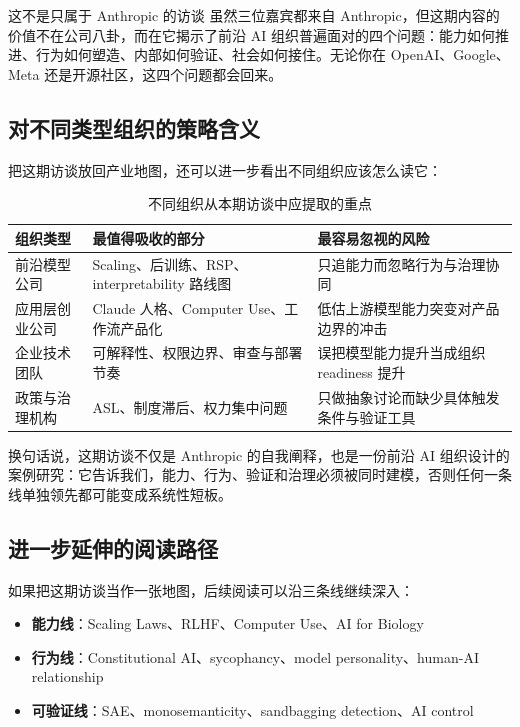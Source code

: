\begin{importantbox}{这不是只属于 Anthropic 的访谈}
虽然三位嘉宾都来自 Anthropic，但这期内容的价值不在公司八卦，而在它揭示了前沿 AI 组织普遍面对的四个问题：能力如何推进、行为如何塑造、内部如何验证、社会如何接住。无论你在 OpenAI、Google、Meta 还是开源社区，这四个问题都会回来。
\end{importantbox}

\subsection{对不同类型组织的策略含义}

把这期访谈放回产业地图，还可以进一步看出不同组织应该怎么读它：

\begin{table}[H]
\centering
\begin{tabular}{p{} p{} p{}}
\toprule
组织类型 & 最值得吸收的部分 & 最容易忽视的风险 \\
\midrule
前沿模型公司 & Scaling、后训练、RSP、interpretability 路线图 & 只追能力而忽略行为与治理协同 \\
应用层创业公司 & Claude 人格、Computer Use、工作流产品化 & 低估上游模型能力突变对产品边界的冲击 \\
企业技术团队 & 可解释性、权限边界、审查与部署节奏 & 误把模型能力提升当成组织 readiness 提升 \\
政策与治理机构 & ASL、制度滞后、权力集中问题 & 只做抽象讨论而缺少具体触发条件与验证工具 \\
\bottomrule
\end{tabular}
\caption{不同组织从本期访谈中应提取的重点}
\end{table}

换句话说，这期访谈不仅是 Anthropic 的自我阐释，也是一份前沿 AI 组织设计的案例研究：它告诉我们，能力、行为、验证和治理必须被同时建模，否则任何一条线单独领先都可能变成系统性短板。

\subsection{进一步延伸的阅读路径}

如果把这期访谈当作一张地图，后续阅读可以沿三条线继续深入：

\begin{itemize}
    \item \textbf{能力线}：Scaling Laws、RLHF、Computer Use、AI for Biology
    \item \textbf{行为线}：Constitutional AI、sycophancy、model personality、human-AI relationship
    \item \textbf{可验证线}：SAE、monosemanticity、sandbagging detection、AI control
\end{itemize}

